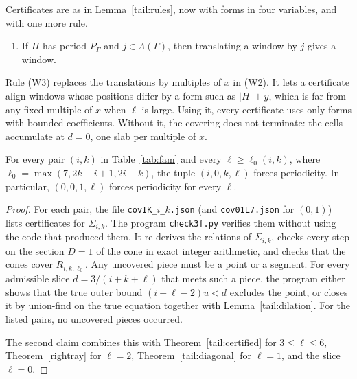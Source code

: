 Certificates are as in Lemma~\ref{tail:rules}, now with forms in four variables, and with one more rule.
\begin{enumerate}
\item[(W3)] If \(\Pi\) has period \(P_\Gamma\) and \(j\in\Lambda(\Gamma)\), then translating a window by \(j\) gives a window.
\end{enumerate}
Rule (W3) replaces the translations by multiples of \(x\) in (W2). It lets a certificate align windows whose positions differ by a form such as \(|H|+y\), which is far from any fixed multiple of \(x\) when \(\ell\) is large. Using it, every certificate uses only forms with bounded coefficients. Without it, the covering does not terminate: the cells accumulate at \(d=0\), one slab per multiple of \(x\).

\begin{theorem}\label{tail:families}
For every pair \((i,k)\) in Table~\ref{tab:fam} and every \(\ell\ge\ell_0(i,k)\), where \(\ell_0=\max(7,2k-i+1,2i-k)\), the tuple \((i,0,k,\ell)\) forces periodicity. In particular, \((0,0,1,\ell)\) forces periodicity for every \(\ell\).
\end{theorem}
\begin{proof}
For each pair, the file \texttt{covIK\_\(i\)\_\(k\).json} (and \texttt{cov01L7.json} for \((0,1)\)) lists certificates for \(\Sigma_{i,k}\). The program \texttt{check3f.py} verifies them without using the code that produced them. It re-derives the relations of \(\Sigma_{i,k}\), checks every step on the section \(D=1\) of the cone in exact integer arithmetic, and checks that the cones cover \(R_{i,k,\ell_0}\). Any uncovered piece must be a point or a segment. For every admissible slice \(d=3/(i+k+\ell)\) that meets such a piece, the program either shows that the true outer bound \((i+\ell-2)u<d\) excludes the point, or closes it by union-find on the true equation together with Lemma~\ref{tail:dilation}. For the listed pairs, no uncovered pieces occurred.

The second claim combines this with Theorem~\ref{tail:certified} for \(3\le\ell\le6\), Theorem~\ref{rightray} for \(\ell=2\), Theorem~\ref{tail:diagonal} for \(\ell=1\), and the slice \(\ell=0\).
\end{proof}



